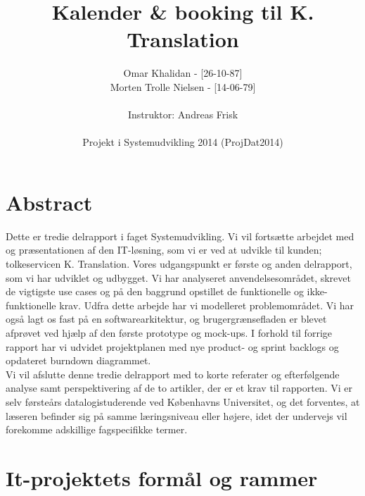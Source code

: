 \documentclass[12pt]{article}   %
\title{Kalender \& booking til K. Translation}
\author{Omar Khalidan - [26-10-87]\\
     Morten Trolle Nielsen - [14-06-79]\\ \\
    Instruktor: Andreas Frisk\\ \\
Projekt i Systemudvikling 2014 (ProjDat2014)}
\begin{document}
\maketitle
\thispagestyle{empty}
\newpage
\tableofcontents
\newpage

\section{Abstract}
Dette er tredie delrapport i faget Systemudvikling. Vi vil fortsætte arbejdet med og præsentationen af den IT-løsning, som vi er ved at udvikle til kunden; tolkeservicen K. Translation. Vores udgangspunkt er første og anden delrapport, som vi har udviklet og udbygget. Vi har analyseret anvendelsesområdet, skrevet de vigtigste use cases og på den baggrund opstillet de funktionelle og ikke-funktionelle krav. Udfra dette arbejde har vi modelleret problemområdet. Vi har også lagt os fast på en softwarearkitektur, og brugergrænsefladen er blevet afprøvet ved hjælp af den første prototype og mock-ups. I forhold til forrige rapport har vi udvidet projektplanen med nye product- og sprint backlogs og opdateret burndown diagrammet. \\
Vi vil afslutte denne tredie delrapport med to korte referater og efterfølgende analyse samt perspektivering af de to artikler, der er et krav til rapporten. Vi er selv førsteårs datalogistuderende ved Københavns Universitet, og det forventes, at læseren befinder sig på samme læringsniveau eller højere, idet der undervejs vil forekomme adskillige fagspecifikke termer. 

\newpage

\section{It-projektets formål og rammer}
\end{document}
